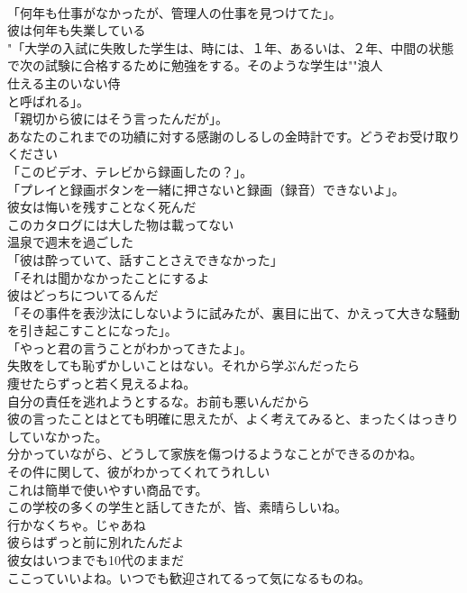 \documentclass[8pt]{extreport}
\begin{document}
\begin{CJK}{UTF8}{min}
\\	「何年も仕事がなかったが、管理人の仕事を見つけてた」。	
\\	彼は何年も失業している	
\\	"「大学の入試に失敗した学生は、時には、１年、あるいは、２年、中間の状態で次の試験に合格するために勉強をする。そのような学生は""浪人
\\	仕える主のいない侍 
\\	と呼ばれる」。
\\	「親切から彼にはそう言ったんだが」。	
\\	あなたのこれまでの功績に対する感謝のしるしの金時計です。どうぞお受け取りください	
\\	「このビデオ、テレビから録画したの？」。	
\\	「プレイと録画ボタンを一緒に押さないと録画（録音）できないよ」。	
\\	彼女は悔いを残すことなく死んだ	
\\	このカタログには大した物は載ってない	
\\	温泉で週末を過ごした	
\\	「彼は酔っていて、話すことさえできなかった」	
\\	「それは聞かなかったことにするよ	
\\	彼はどっちについてるんだ	
\\	「その事件を表沙汰にしないように試みたが、裏目に出て、かえって大きな騒動を引き起こすことになった」。	
\\	「やっと君の言うことがわかってきたよ」。	
\\	失敗をしても恥ずかしいことはない。それから学ぶんだったら	
\\	痩せたらずっと若く見えるよね。	
\\	自分の責任を逃れようとするな。お前も悪いんだから	
\\	彼の言ったことはとても明確に思えたが、よく考えてみると、まったくはっきりしていなかった。	
\\	分かっていながら、どうして家族を傷つけるようなことができるのかね。	
\\	その件に関して、彼がわかってくれてうれしい	
\\	これは簡単で使いやすい商品です。	
\\	この学校の多くの学生と話してきたが、皆、素晴らしいね。	
\\	行かなくちゃ。じゃあね	
\\	彼らはずっと前に別れたんだよ	
\\	彼女はいつまでも10代のままだ	
\\	ここっていいよね。いつでも歓迎されてるって気になるものね。	

\end{CJK}
\end{document}
